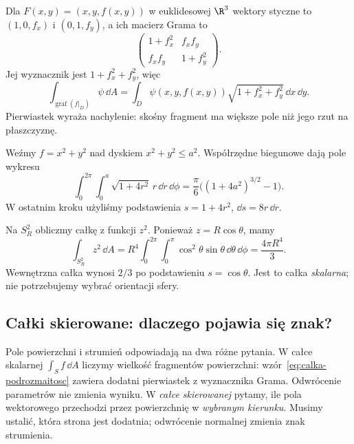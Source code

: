 \begin{przyklad}
\label{prz:calka-po-wykresie}
Dla $F(x,y)=(x,y,f(x,y))$ w euklidesowej $\R^3$
wektory styczne to $(1,0,f_x)$ i $(0,1,f_y)$,
a ich macierz Grama to
\[
 \begin{pmatrix}1+f_x^2&f_xf_y\\
                 f_xf_y&1+f_y^2\end{pmatrix}.
\]
Jej wyznacznik jest $1+f_x^2+f_y^2$, więc
\begin{equation}\label{eq:calka-wykres}
 \int_{\operatorname{graf}(f|_D)}\psi\,\dd A
 =\int_D\psi(x,y,f(x,y))
        \sqrt{1+f_x^2+f_y^2}\,\dd x\,\dd y.
\end{equation}
Pierwiastek wyraża nachylenie: skośny fragment
ma większe pole niż jego rzut na płaszczyznę.

Weźmy $f=x^2+y^2$ nad dyskiem $x^2+y^2\leq a^2$.
Współrzędne biegunowe dają pole wykresu
\[
 \int_0^{2\pi}\!\int_0^a
   \sqrt{1+4r^2}\,r\,\dd r\,\dd\phi
 =\frac{\pi}{6}\bigl((1+4a^2)^{3/2}-1\bigr).
\]
W ostatnim kroku użyliśmy podstawienia
$s=1+4r^2$, $\dd s=8r\,\dd r$.
\end{przyklad}

\begin{przyklad}
Na $S_R^2$ obliczmy całkę z funkcji $z^2$.
Ponieważ $z=R\cos\theta$, mamy
\[
 \int_{S_R^2}z^2\,\dd A
 =R^4\int_0^{2\pi}\!\int_0^\pi
       \cos^2\theta\sin\theta\,\dd\theta\,\dd\phi
 =\frac{4\pi R^4}{3}.
\]
Wewnętrzna całka wynosi $2/3$ po podstawieniu
$s=\cos\theta$. Jest to całka \emph{skalarna};
nie potrzebujemy wybrać orientacji sfery.
\end{przyklad}

\subsection*{Całki skierowane: dlaczego pojawia się znak?}

Pole powierzchni i strumień odpowiadają na dwa różne
pytania. W całce skalarnej
$\int_S f\,\dd A$ liczymy wielkość fragmentów
powierzchni: wzór~\eqref{eq:calka-podrozmaitosc}
zawiera dodatni pierwiastek z wyznacznika Grama.
Odwrócenie parametrów nie zmienia wyniku.
W \emph{całce skierowanej} pytamy, ile pola
wektorowego przechodzi przez powierzchnię
w \emph{wybranym kierunku}. Musimy ustalić,
która strona jest dodatnia; odwrócenie
normalnej zmienia znak strumienia.

